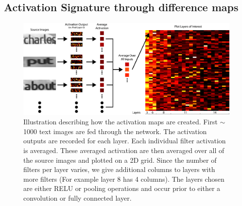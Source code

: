 \documentclass[10pt,twocolumn,letterpaper]{article}
\begin{document}
\subsection{Activation Signature through difference maps} \label{sec:subnetwork}
\begin{figure}
\centering
\includegraphics[width=1\textwidth]{Figures/activations_map_overview/act_map_overview-01.png}
\caption{Illustration describing how the activation maps are created. First $\sim$1000 text images are fed through the network. The activation outputs are recorded for each layer. Each individual filter activation is averaged. These averaged activation are then averaged over all of the source images and plotted on a 2D grid. Since the number of filters per layer varies, we give additional columns to layers with more filters (For example layer 8 has 4 columns). The layers chosen are either RELU or pooling operations and occur prior to either a convolution or fully connected layer.}
\label{fig:subvis}
\end{figure}
\end{document}

